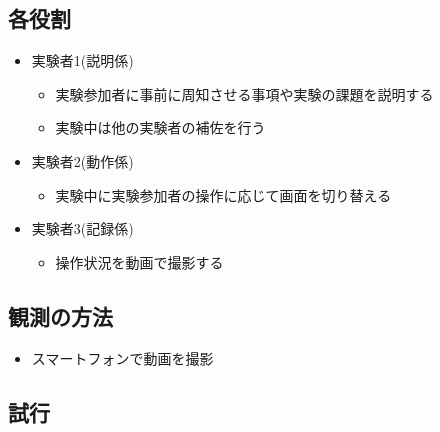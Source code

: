 \documentclass[12pt,a4paper,dvipdf]{jsarticle}
\begin{document}
\subsection{各役割}
\begin{itemize}
    \item 実験者1(説明係)
          \begin{itemize}
              \item 実験参加者に事前に周知させる事項や実験の課題を説明する
              \item 実験中は他の実験者の補佐を行う
          \end{itemize}
    \item 実験者2(動作係)
          \begin{itemize}
              \item 実験中に実験参加者の操作に応じて画面を切り替える
          \end{itemize}
    \item 実験者3(記録係)
          \begin{itemize}
              \item 操作状況を動画で撮影する
          \end{itemize}
\end{itemize}
\subsection{観測の方法}
\begin{itemize}
    \item スマートフォンで動画を撮影
\end{itemize}
\subsection{試行}
\end{document}
